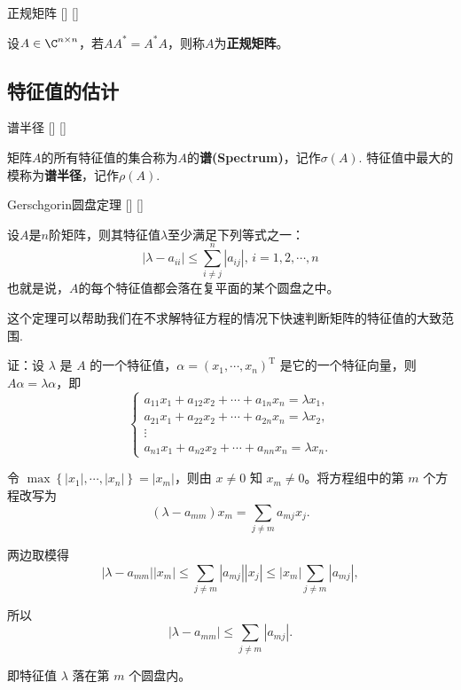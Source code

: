 \documentclass[UTF8]{ctexart}
\begin{document}
		\begin{dfn}
			[]
			{正规矩阵}
			[]
			[]
			
			设$A\in\C^{n\times n}$，若$AA^*=A^*A$，则称$A$为\textbf{正规矩阵}。
		\end{dfn}
		
	\subsection{特征值的估计}
		
		\begin{dfn}
			[]
			{谱半径}
			[]
			[]

			矩阵$A$的所有特征值的集合称为$A$的\textbf{谱(Spectrum)}，记作$\sigma(A)$. 特征值中最大的模称为\textbf{谱半径}，记作$\rho(A)$.
		\end{dfn}

		\begin{thm}
			[]
			{Gerschgorin圆盘定理}
			[]
			[]

			设$A$是$n$阶矩阵，则其特征值$\lambda$至少满足下列等式之一：\[|\lambda-a_{ii}|\leqslant\sum_{i\neq j}^{n}|a_{ij}|,\,i=1,2,\cdots,n  
			\]
			也就是说，$A$的每个特征值都会落在复平面的某个圆盘之中。
		\end{thm}

		这个定理可以帮助我们在不求解特征方程的情况下快速判断矩阵的特征值的大致范围.
		
		\begin{prf}
			证：设 $\lambda$ 是 $A$ 的一个特征值，$\alpha=\left(x_1,\cdots, x_n\right)^{\mathrm{T}}$ 是它的一个特征向量，则 $A\alpha=\lambda\alpha$，即
			\begin{equation*}
				\begin{cases}
					a_{11} x_1+a_{12} x_2+\cdots+a_{1 n} x_n=\lambda x_1,\\
					a_{21} x_1+a_{22} x_2+\cdots+a_{2 n} x_n=\lambda x_2,\\
					\vdots\\
					a_{n 1} x_1+a_{n 2} x_2+\cdots+a_{nn} x_n=\lambda x_n.
					\end{cases}
			\end{equation*}
	
			令 $\max\left\{\left|x_1\right|,\cdots,\left|x_n\right|\right\}=\left|x_m\right|$，则由 $x\neq 0$ 知 $x_m\neq 0$。将方程组中的第 $m$ 个方程改写为
			\begin{equation*}
				(\lambda-a_{mm}) x_m=\sum_{j\neq m} a_{mj} x_j.
			\end{equation*}
	
			两边取模得
			\begin{equation*}
				\left|\lambda-a_{mm}\right|\left|x_m\right|\leqslant\sum_{j\neq m}\left|a_{mj}\right|\left|x_j\right|\leqslant\left|x_m\right|\sum_{j\neq m}\left|a_{mj}\right|,
			\end{equation*}
	
			所以
			\begin{equation*}
				\left|\lambda-a_{mm}\right|\leqslant\sum_{j\neq m}\left|a_{mj}\right|.
			\end{equation*}
	
			即特征值 $\lambda$ 落在第 $m$ 个圆盘内。
	
		\end{prf}
\end{document}
